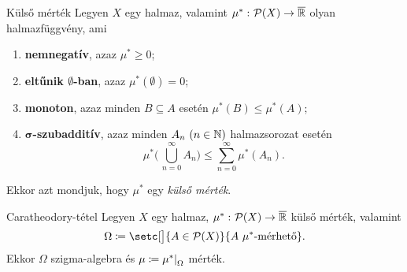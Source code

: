 \documentclass[
]{elteikthesis}[2024/04/26]
\begin{document}
	\begin{definition}{Külső mérték}{}
		Legyen \( X \) egy halmaz, 
		valamint \( \mu^* \,\colon  \mathcal{P}( X )  \to  \overline{\mathbb{R}} \) olyan halmazfüggvény, ami
			\begin{enumerate}
			\item 
			\textbf{nemnegatív}, azaz \( \mu^* \geq 0 \);
			
			\item 
			\textbf{eltűnik \( \boldsymbol{\emptyset} \)-ban}, azaz
			\( \mu^*(\emptyset) = 0 \);
			
			\item 
			\textbf{monoton}, 
			azaz minden \( B \subseteq A \) esetén \( \mu^*(B) \leq \mu^*(A) \);
			
			\item
			\textbf{\( \boldsymbol{\sigma}\)-szubadditív}, 
			azaz minden \( A_n \ (n \in \mathbb{N} ) \) halmazsorozat esetén
			\[
				\mu^* \Biggl( \, \bigcup\limits_{n=0}^\infty A_n \Biggr) \leq 
				\sum\limits_{n=0}^{\infty} \mu^*(A_n).
			\]
		\end{enumerate}
		Ekkor azt mondjuk, hogy \( \mu^* \) egy \emph{külső mérték}.
	\end{definition}
	
	\begin{theorem}{Caratheodory-tétel}{}
		Legyen \( X \) egy halmaz, 
		\( \mu^* \,\colon  \mathcal{P}( X )  \to  \overline{\mathbb{R}} \) külső mérték, valamint
		\[
			\Omega \coloneq \setc[\big]{ A \in \powerset{X} }{ A \ \mu^* \text{-mérhető} }.
		\]
		Ekkor \( \Omega \) szigma-algebra és \( \mu \coloneq \restr{\mu^*}{\Omega} \) mérték.
	\end{theorem}
	
\end{document}
